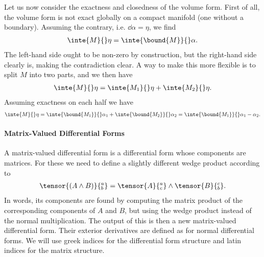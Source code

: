 Let us now consider the exactness and closedness of the volume form. First of all, the volume form is not exact globally on a compact manifold (one without a boundary). Assuming the contrary, i.e. $\dd{\alpha} = \eta$, we find
\begin{align*}
	\inte{M}{}\eta = \inte{\bound{M}}{}\alpha.
\end{align*}
The left-hand side ought to be non-zero by construction, but the right-hand side clearly is, making the contradiction clear. A way to make this more flexible is to split $M$ into two parts, and we then have
\begin{align*}
	\inte{M}{}\eta = \inte{M_{1}}{}\eta + \inte{M_{2}}{}\eta.
\end{align*}
Assuming exactness on each half we have
\begin{align*}
	\inte{M}{}\eta = \inte{\bound{M_{1}}}{}\alpha_{1} + \inte{\bound{M_{2}}}{}\alpha_{2} = \inte{\bound{M_{1}}}{}\alpha_{1} - \alpha_{2}.
\end{align*}

\paragraph{Matrix-Valued Differential Forms}
A matrix-valued differential form is a differential form whose components are matrices. For these we need to define a slightly different wedge product according to
\begin{align*}
	\tensor{(A\wedge B)}{^{a}_{b}} = \tensor{A}{^{a}_{c}}\wedge\tensor{B}{^{c}_{b}}.
\end{align*}
In words, its components are found by computing the matrix product of the corresponding components of $A$ and $B$, but using the wedge product instead of the normal multiplication. The output of this is then a new matrix-valued differential form. Their exterior derivatives are defined as for normal differential forms. We will use greek indices for the differential form structure and latin indices for the matrix structure.

